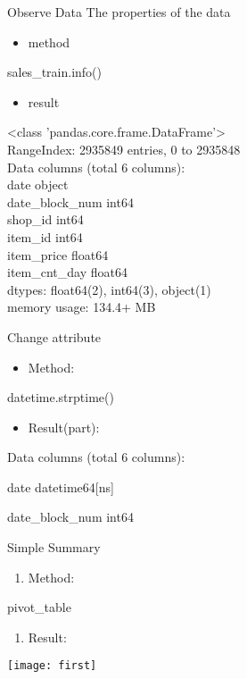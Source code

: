 \documentclass[
 size=12pt,
 paper=smartboard, %
 mode=present, %
 display=slides, %
style=tuliplab,
pauseslide,
fleqn,leqno]{powerdot}
\begin{document}
\begin{slide}{Observe Data}
The properties of the data

\begin{itemize}
\item method
\end{itemize}

sales_train.info()

\begin{itemize}
\item result
\end{itemize}
<class 'pandas.core.frame.DataFrame'>  \\
RangeIndex: 2935849 entries, 0 to 2935848  \\
Data columns (total 6 columns):  \\
date              object  \\
date_block_num    int64  \\
shop_id           int64  \\
item_id           int64  \\
item_price        float64  \\
item_cnt_day      float64  \\
dtypes: float64(2), int64(3), object(1)  \\
memory usage: 134.4+ MB

\end{slide}

\begin{slide}{Change attribute }

\begin{itemize}[type=1]
\item Method:
\end{itemize}
datetime.strptime()

\begin{itemize}[type=1]
\item Result(part):
\end{itemize}

 Data columns (total 6 columns): \par
 date   \hspace{3em}           datetime64[ns] \par
 date_block_num   \enspace  int64

\end{slide}

\begin{slide}{Simple Summary }
\begin{enumerate}[type=1]%
\item Method:
\end{enumerate}
\center
pivot_table
\begin{enumerate}[type=1]%
\item Result:
\end{enumerate}
\texttt{[image: first]}
\end{slide}
\end{document}
